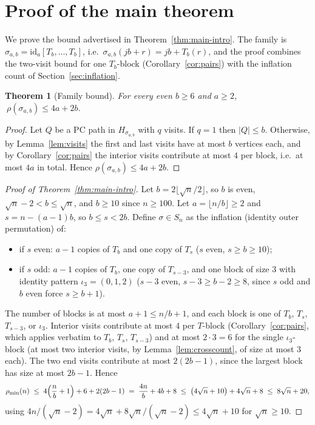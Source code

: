 \documentclass[11pt]{article}
\newtheorem{theorem}{Theorem}[section]
\theoremstyle{definition}
\newcommand{\pmin}{\rho_{\min}}
\begin{document}
\section{Proof of the main theorem}\label{sec:main}

We prove the bound advertised in Theorem~\ref{thm:main-intro}. The family is
$\sigma_{a,b} = \mathrm{id}_a[T_b, \dots, T_b]$, i.e.\ $\sigma_{a,b}(jb+r) = jb + T_b(r)$,
and the proof combines the two-visit bound for one $T_b$-block
(Corollary~\ref{cor:pairs}) with the inflation count of Section~\ref{sec:inflation}.

\begin{theorem}[Family bound]\label{thm:main}
For every even $b \ge 6$ and $a \ge 2$, $\ \rho(\sigma_{a,b}) \le 4a + 2b$.
\end{theorem}

\begin{proof}
Let $Q$ be a PC path in $H_{\sigma_{a,b}}$ with $q$ visits. If
$q = 1$ then $|Q| \le b$. Otherwise, by Lemma~\ref{lem:visits} the first and last visits
have at most $b$ vertices each, and by Corollary~\ref{cor:pairs} the interior visits
contribute at most $4$ per block, i.e.\ at most $4a$ in total. Hence
$\rho(\sigma_{a,b}) \le 4a + 2b$.
\end{proof}

\begin{proof}[Proof of Theorem~\ref{thm:main-intro}]
Let $b = 2\lfloor \sqrt n / 2 \rfloor$, so $b$ is even,
$\sqrt n - 2 < b \le \sqrt n$, and $b \ge 10$ since $n \ge 100$. Let
$a = \lfloor n/b \rfloor \ge 2$ and $s = n - (a-1)b$, so $b \le s < 2b$. Define
$\sigma \in S_n$ as the inflation (identity outer permutation) of:
\begin{itemize}
\item if $s$ even: $a - 1$ copies of $T_b$ and one copy of $T_s$ ($s$ even,
$s \ge b \ge 10$);
\item if $s$ odd: $a - 1$ copies of $T_b$, one copy of $T_{s-3}$, and one block of size
$3$ with identity pattern $\iota_3 = (0,1,2)$ ($s-3$ even, $s-3 \ge b-2 \ge 8$, since
$s$ odd and $b$ even force $s \ge b+1$).
\end{itemize}
The number of blocks is at most $a+1 \le n/b + 1$, and each block is one of $T_b$, $T_s$,
$T_{s-3}$, or $\iota_3$. Interior visits contribute at most $4$ per $T$-block
(Corollary~\ref{cor:pairs}, which applies verbatim to $T_b$, $T_s$, $T_{s-3}$) and at
most $2 \cdot 3 = 6$ for the single $\iota_3$-block (at most two interior visits, by
Lemma~\ref{lem:crosscount}, of size at most $3$ each). The two end visits contribute at
most $2(2b-1)$, since the largest block has size at most $2b-1$. Hence
\[
\pmin(n) \;\le\; 4\Bigl(\frac n b + 1\Bigr) + 6 + 2(2b-1) \;=\; \frac{4n}{b} + 4b + 8
\;\le\; \bigl(4\sqrt n + 10\bigr) + 4\sqrt n + 8 \;\le\; 8\sqrt n + 20,
\]
using $4n/(\sqrt n - 2) = 4\sqrt n + 8\sqrt n/(\sqrt n - 2) \le 4\sqrt n + 10$ for
$\sqrt n \ge 10$.
\end{proof}
\end{document}
